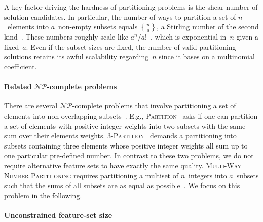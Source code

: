 \documentclass{article}
\theoremstyle{definition}
\newcommand{\stirling}[2]{\genfrac\{\}{0pt}{}{#1}{#2}} %
\begin{document}
A key factor driving the hardness of partitioning problems is the shear number of solution candidates.
In particular, the number of ways to partition a set of $n$~elements into $a$~non-empty subsets equals $\stirling{n}{a}$, a Stirling number of the second kind~\cite{graham1994concrete}.
These numbers roughly scale like $a^n / a!$~\cite{moser1958stirling}, which is exponential in~$n$ given a fixed~$a$.
Even if the subset sizes are fixed, the number of valid partitioning solutions retains its awful scalability regarding~$n$ since it bases on a multinomial coefficient.

\paragraph{Related $\mathcal{NP}$-complete problems}

There are several $\mathcal{NP}$-complete problems that involve partitioning a set of elements into non-overlapping subsets~\cite{garey2003computers}.
E.g., \textsc{Partition}~\cite{karp1972reducibility} asks if one can partition a set of elements with positive integer weights into two subsets with the same sum over their elements weights.
\textsc{3-Partition}~\cite{garey2003computers} demands a partitioning into subsets containing three elements whose positive integer weights all sum up to one particular pre-defined number.
In contrast to these two problems, we do not require alternative feature sets to have exactly the same quality.
\textsc{Multi-Way Number Partitioning} requires partitioning a multiset of $n$~integers into $a$~subsets such that the sums of all subsets are as equal as possible~\cite{korf2010objective}.
We focus on this problem in the following.

\paragraph{Unconstrained feature-set size}
\end{document}
